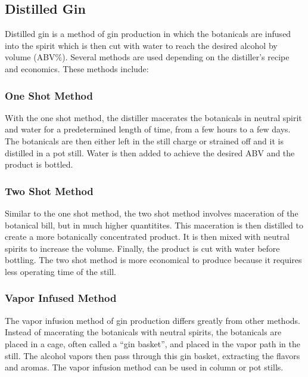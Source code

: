 \subsection{Distilled Gin}
Distilled gin is a method of gin production in which the botanicals are infused
into the spirit which is then cut with water to reach the desired alcohol by
volume (ABV\%). Several methods are used depending on the distiller's recipe
and economics. These methods include: 

\subsubsection{One Shot Method}
With the one shot method, the distiller macerates the botanicals in neutral
spirit and water for a predetermined length of time, from a few hours to a few
days. The botanicals are then either left in the still charge or strained off
and it is distilled in a pot still. Water is then added to achieve the desired
ABV and the product is bottled.

\subsubsection{Two Shot Method}
Similar to the one shot method, the two shot method involves maceration of the
botanical bill, but in much higher quantitites. This maceration is then
distilled to create a more botanically concentrated product. It is then mixed
with neutral spirits to increase the volume. Finally, the product is cut with
water before bottling. The two shot method is more economical to produce
because it requires less operating time of the still.

\subsubsection{Vapor Infused Method} 
The vapor infusion method of gin production differs greatly from other methods.
Instead of macerating the botanicals with neutral spirits, the botanicals are
placed in a cage, often called a ``gin basket'', and placed in the vapor path
in the still. The alcohol vapors then pass through this gin basket,
extracting the flavors and aromas. The vapor infusion method can be used in
column or pot stills.



